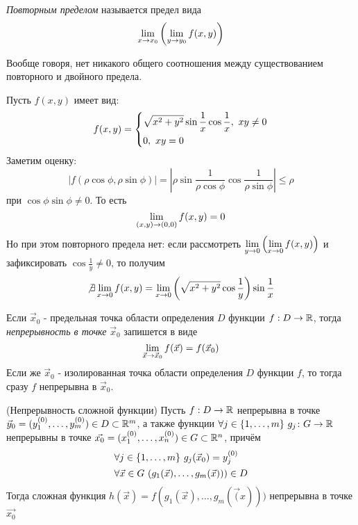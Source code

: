 \begin{definition}
	\textit{Повторным пределом} называется предел вида
	\[
		\lim\limits_{x \to x_0} \left(\lim\limits_{y \to y_0} f(x, y)\right)
	\]
\end{definition}

\begin{note}
	Вообще говоря, нет никакого общего соотношения между существованием повторного и двойного предела.
\end{note}

\begin{example}
	Пусть $f(x, y)$ имеет вид:
	\[
		f(x, y) = \System{
			&{\sqrt{x^2 + y^2} \sin \frac{1}{x} \cos \frac{1}{x}},\ xy \neq 0
			\\
			&{0,\ xy = 0}
		}
	\]
	Заметим оценку:
	\[
		|f(\rho\cos\phi, \rho\sin\phi)| = |\rho\sin\frac{1}{\rho\cos\phi}\cos\frac{1}{\rho\sin\phi}| \le \rho
	\]
	при $\cos\phi\sin\phi \neq 0$. То есть
	\[
		\lim\limits_{(x, y) \to (0, 0)} f(x, y) = 0
	\]
	Но при этом повторного предела нет: если рассмотреть $\lim\limits_{y \to 0} \left(\lim\limits_{x \to 0} f(x, y)\right)$ и зафиксировать $\cos \frac{1}{y} \neq 0$, то получим
	\[
		\not\exists \lim\limits_{x \to 0} f(x, y) = \lim\limits_{x \to 0} \left(\sqrt{x^2 + y^2} \cos\frac{1}{y}\right)\sin\frac{1}{x}
	\]
\end{example}

\begin{definition}
	Если $\vec{x}_0$ - предельная точка области определения $D$ функции $f: D \to \mathbb{R}$, тогда \textit{непрерывность в точке} $\vec{x}_0$ запишется в виде
	\[
		\lim\limits_{\vec{x} \to \vec{x}_0} f(\vec{x}) = f(\vec{x}_0)
	\]
	Если же $\vec{x}_0$ - изолированная точка области определения $D$ функции $f$, то тогда сразу $f$ непрерывна в $\vec{x}_0$.
\end{definition}

\begin{theorem} (Непрерывность сложной функции)
	Пусть $f: D \to \mathbb{R}$ непрерывна в точке $\vec{y}_0 = (y_1^{(0)}, \ldots, y_m^{(0)}) \in D \subset \mathbb{R}^m$, а также функции $\forall j \in \{1, \ldots, m\}\ g_j \colon G \to \mathbb{R}$ непрерывны в точке $\vec{x_0} = (x_1^{(0)}, \ldots, x_n^{(0)}) \in G \subset \mathbb{R}^n$, причём
	\begin{align*}
		&{\forall j \in \{1, \ldots, m\}\ g_j(\vec{x}_0) = y_j^{(0)}}
		\\
		&{\forall \vec{x} \in G\ (g_1(\vec{x}), \ldots, g_m(\vec{x}))) \in D}
	\end{align*}
	Тогда сложная функция $h(\vec{x}) = f(g_1(\vec{x}), \ldots, g_m(\vec(x)))$ непрерывна в точке $\vec{x_0}$
\end{theorem}


